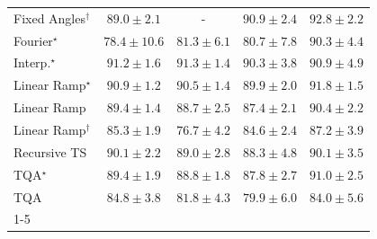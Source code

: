 \begin{tabular}{l|cccc|}
Fixed Angles$^\dagger$ & {\cellcolor[HTML]{045483}} \color[HTML]{F1F1F1} $89.0\pm 2.1$ & {\cellcolor[HTML]{000000}} \color[HTML]{F1F1F1} {\cellcolor{white}} \color{black} - & {\cellcolor[HTML]{034871}} \color[HTML]{F1F1F1} $90.9\pm 2.4$ & {\cellcolor[HTML]{023B5D}} \color[HTML]{F1F1F1} $92.8\pm 2.2$ \\
Fourier$^\star$ & {\cellcolor[HTML]{2D8ABD}} \color[HTML]{F1F1F1} $78.4\pm 10.6$ & {\cellcolor[HTML]{1379B5}} \color[HTML]{F1F1F1} $81.3\pm 6.1$ & {\cellcolor[HTML]{187CB6}} \color[HTML]{F1F1F1} $80.7\pm 7.8$ & {\cellcolor[HTML]{034B76}} \color[HTML]{F1F1F1} $90.3\pm 4.4$ \\
Interp.$^\star$ & {\cellcolor[HTML]{03466E}} \color[HTML]{F1F1F1} $91.2\pm 1.6$ & {\cellcolor[HTML]{03456C}} \color[HTML]{F1F1F1} $91.3\pm 1.4$ & {\cellcolor[HTML]{034B76}} \color[HTML]{F1F1F1} $90.3\pm 3.8$ & {\cellcolor[HTML]{034871}} \color[HTML]{F1F1F1} $90.9\pm 4.9$ \\
Linear Ramp$^\star$ & {\cellcolor[HTML]{034871}} \color[HTML]{F1F1F1} $90.9\pm 1.2$ & {\cellcolor[HTML]{034A74}} \color[HTML]{F1F1F1} $90.5\pm 1.4$ & {\cellcolor[HTML]{034E7B}} \color[HTML]{F1F1F1} $89.9\pm 2.0$ & {\cellcolor[HTML]{034267}} \color[HTML]{F1F1F1} $91.8\pm 1.5$ \\
Linear Ramp & {\cellcolor[HTML]{045280}} \color[HTML]{F1F1F1} $89.4\pm 1.4$ & {\cellcolor[HTML]{045687}} \color[HTML]{F1F1F1} $88.7\pm 2.5$ & {\cellcolor[HTML]{045D92}} \color[HTML]{F1F1F1} $87.4\pm 2.1$ & {\cellcolor[HTML]{034B76}} \color[HTML]{F1F1F1} $90.4\pm 2.2$ \\
Linear Ramp$^\dagger$ & {\cellcolor[HTML]{05659F}} \color[HTML]{F1F1F1} $85.3\pm 1.9$ & {\cellcolor[HTML]{3F93C2}} \color[HTML]{F1F1F1} $76.7\pm 4.2$ & {\cellcolor[HTML]{0569A4}} \color[HTML]{F1F1F1} $84.6\pm 2.4$ & {\cellcolor[HTML]{045E93}} \color[HTML]{F1F1F1} $87.2\pm 3.9$ \\
Recursive TS & {\cellcolor[HTML]{034C78}} \color[HTML]{F1F1F1} $90.1\pm 2.2$ & {\cellcolor[HTML]{045483}} \color[HTML]{F1F1F1} $89.0\pm 2.8$ & {\cellcolor[HTML]{04588A}} \color[HTML]{F1F1F1} $88.3\pm 4.8$ & {\cellcolor[HTML]{034C78}} \color[HTML]{F1F1F1} $90.1\pm 3.5$ \\
TQA$^\star$ & {\cellcolor[HTML]{045280}} \color[HTML]{F1F1F1} $89.4\pm 1.9$ & {\cellcolor[HTML]{045585}} \color[HTML]{F1F1F1} $88.8\pm 1.8$ & {\cellcolor[HTML]{045B8E}} \color[HTML]{F1F1F1} $87.8\pm 2.7$ & {\cellcolor[HTML]{03476F}} \color[HTML]{F1F1F1} $91.0\pm 2.5$ \\
TQA & {\cellcolor[HTML]{0567A2}} \color[HTML]{F1F1F1} $84.8\pm 3.8$ & {\cellcolor[HTML]{0F76B3}} \color[HTML]{F1F1F1} $81.8\pm 4.3$ & {\cellcolor[HTML]{2081B9}} \color[HTML]{F1F1F1} $79.9\pm 6.0$ & {\cellcolor[HTML]{056BA7}} \color[HTML]{F1F1F1} $84.0\pm 5.6$ \\
\cline{1-5}
\bottomrule
\end{tabular}
